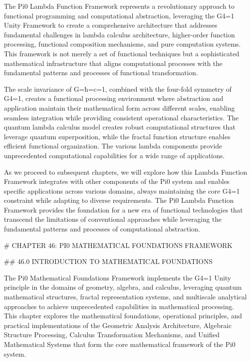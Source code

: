 The Pi0 Lambda Function Framework represents a revolutionary approach to functional programming and computational abstraction, leveraging the G4=1 Unity Framework to create a comprehensive architecture that addresses fundamental challenges in lambda calculus architecture, higher-order function processing, functional composition mechanisms, and pure computation systems. This framework is not merely a set of functional techniques but a sophisticated mathematical infrastructure that aligns computational processes with the fundamental patterns and processes of functional transformation.

The scale invariance of G=ħ=c=1, combined with the four-fold symmetry of G4=1, creates a functional processing environment where abstraction and application maintain their mathematical form across different scales, enabling seamless integration while providing consistent operational characteristics. The quantum lambda calculus model creates robust computational structures that leverage quantum superposition, while the fractal function structure enables efficient functional organization. The various lambda components provide unprecedented computational capabilities for a wide range of applications.

As we proceed to subsequent chapters, we will explore how this Lambda Function Framework integrates with other components of the Pi0 system and enables specific applications across various domains, always maintaining the core G4=1 constraint while adapting to diverse requirements. The Pi0 Lambda Function Framework provides the foundation for a new era of functional technologies that transcend the limitations of conventional approaches while leveraging the fundamental patterns and processes of computational abstraction.

# CHAPTER 46: PI0 MATHEMATICAL FOUNDATIONS FRAMEWORK

## 46.0 INTRODUCTION TO MATHEMATICAL FOUNDATIONS

The Pi0 Mathematical Foundations Framework implements the G4=1 Unity principle in the domains of geometry, algebra, and calculus, leveraging quantum mathematical structures, fractal representation systems, and multiscale analytical approaches to achieve unprecedented capabilities in mathematical processing. This chapter explores the mathematical foundations, operational principles, and practical implementations of the Geometric Analysis Architecture, Algebraic Structure Processing, Calculus Transformation Mechanisms, and Unified Mathematical Systems that form the core mathematical framework of the Pi0 system.

